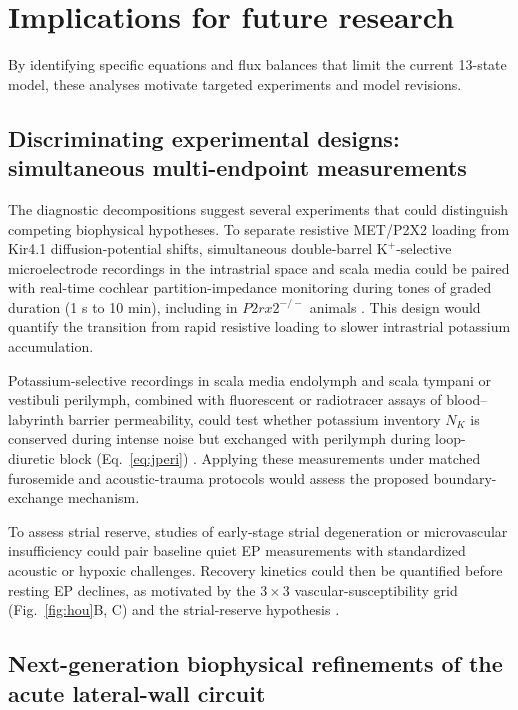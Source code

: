 \documentclass[final,5p,times]{elsarticle}
\begin{document}
\section{Implications for future research}\label{sec:future}

By identifying specific equations and flux balances that limit the current 13-state model, these analyses motivate targeted experiments and model revisions.

\subsection{Discriminating experimental designs: simultaneous multi-endpoint measurements}\label{sec:future-experiments}

The diagnostic decompositions suggest several experiments that could distinguish competing biophysical hypotheses. To separate resistive MET/P2X2 loading from Kir4.1 diffusion-potential shifts, simultaneous double-barrel \(\mathrm{K}^+\)-selective microelectrode recordings in the intrastrial space and scala media could be paired with real-time cochlear partition-impedance monitoring during tones of graded duration (1 s to 10 min), including in \(P2rx2^{-/-}\) animals \citep{Housley2013}. This design would quantify the transition from rapid resistive loading to slower intrastrial potassium accumulation.

Potassium-selective recordings in scala media endolymph and scala tympani or vestibuli perilymph, combined with fluorescent or radiotracer assays of blood--labyrinth barrier permeability, could test whether potassium inventory \(N_K\) is conserved during intense noise but exchanged with perilymph during loop-diuretic block (Eq.~\ref{eq:jperi}) \citep{Shi2016}. Applying these measurements under matched furosemide and acoustic-trauma protocols would assess the proposed boundary-exchange mechanism.

To assess strial reserve, studies of early-stage strial degeneration or microvascular insufficiency could pair baseline quiet EP measurements with standardized acoustic or hypoxic challenges. Recovery kinetics could then be quantified before resting EP declines, as motivated by the \(3\times3\) vascular-susceptibility grid (Fig.~\ref{fig:hou}B, C) and the strial-reserve hypothesis \citep{Ohlemiller2006,Ohlemiller2009}.

\subsection{Next-generation biophysical refinements of the acute lateral-wall circuit}\label{sec:future-acute-model}
\end{document}
